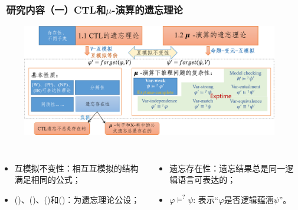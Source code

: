 \documentclass[aspectratio=1610, 9pt, CJK]{beamer}
\begin{document}
\begin{frame}  
	\frametitle{~研究内容（一）CTL和$\mu$-演算的遗忘理论}
	\begin{figure}
		\includegraphics[scale=0.45]{figures/ctlMuForgFrame}
	\end{figure}
	{\tiny 
		\begin{columns}
			\begin{itemize} 
				\item 互模拟不变性：相互互模拟的结构满足相同的公式；
				\item (\W)、(\PP)、(\NgP)和(\IR)：为遗忘理论公设；
			\end{itemize}
			\begin{itemize}
				\item 遗忘存在性：遗忘结果总是同一逻辑语言可表达的；
				\item $\varphi \models^? \psi$: 表示“$\varphi$是否逻辑蕴涵$\psi$”。
			\end{itemize}
		\end{columns}
	} 
\end{frame}
\end{document}

